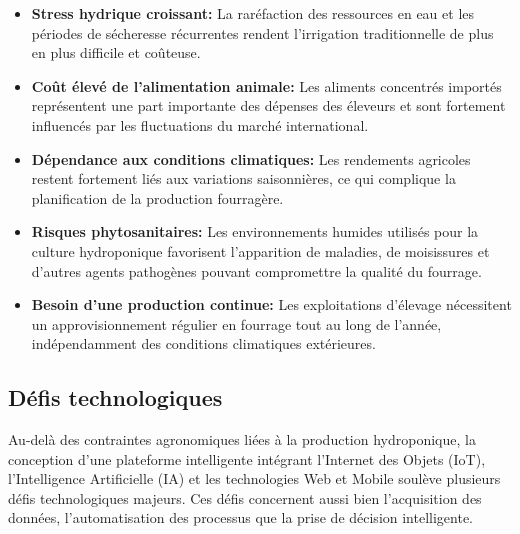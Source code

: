 \begin{itemize}
	
	\item \textbf{Stress hydrique croissant:} La raréfaction des ressources en eau et les périodes de sécheresse récurrentes rendent l’irrigation traditionnelle de plus en plus difficile et coûteuse.
	
	\item \textbf{Coût élevé de l’alimentation animale: } Les aliments concentrés importés représentent une part importante des dépenses des éleveurs et sont fortement influencés par les fluctuations du marché international.
	
	\item \textbf{Dépendance aux conditions climatiques: } Les rendements agricoles restent fortement liés aux variations saisonnières, ce qui complique la planification de la production fourragère.
	
	\item \textbf{Risques phytosanitaires: } Les environnements humides utilisés pour la culture hydroponique favorisent l’apparition de maladies, de moisissures et d’autres agents pathogènes pouvant compromettre la qualité du fourrage.
	
	\item \textbf{Besoin d’une production continue: } Les exploitations d’élevage nécessitent un approvisionnement régulier en fourrage tout au long de l’année, indépendamment des conditions climatiques extérieures.
	
\end{itemize}

\subsection{Défis technologiques}

Au-delà des contraintes agronomiques liées à la production hydroponique, la conception d’une plateforme intelligente intégrant l’Internet des Objets (IoT), l’Intelligence Artificielle (IA) et les technologies Web et Mobile soulève plusieurs défis technologiques majeurs. Ces défis concernent aussi bien l’acquisition des données, l’automatisation des processus que la prise de décision intelligente.

